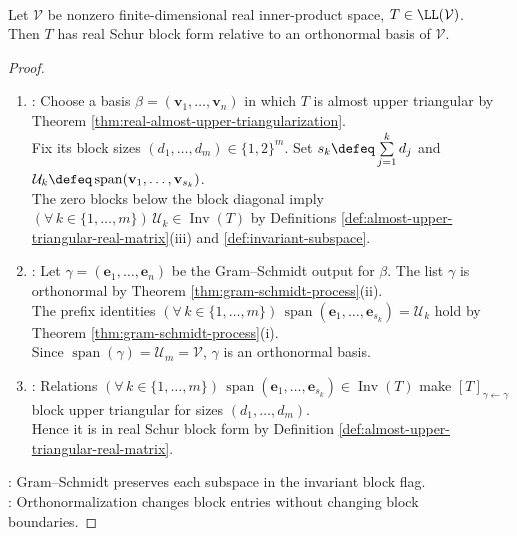 \begin{corollary} \label{cor:real-schur-block-form-orthonormal} \\
Let $\mathcal{V}$ be nonzero finite-dimensional real inner-product space, $T\in\LL(\mathcal{V})$.\\
Then $T$ has real Schur block form relative to an orthonormal basis of $\mathcal{V}$.
\begin{proof}
\begin{enumerate}[label=(\roman*)]
\setlength{\itemsep}{0pt}
\item {}: Choose a basis $\beta=(\mathbf{v}_1,\ldots,\mathbf{v}_n)$ in which $T$ is almost upper triangular by Theorem \ref{thm:real-almost-upper-triangularization}.\\
Fix its block sizes $(d_1,\ldots,d_m)\in\{1,2\}^m$. Set $s_k\defeq\sum\limits_{j=1}^{k}d_j$ and $\mathcal{U}_k\defeq\operatorname{span}(\mathbf{v}_1,\ldots,\mathbf{v}_{s_k})$.\\
The zero blocks below the block diagonal imply $(\forall\,k\in\{1,\ldots,m\})\,\mathcal{U}_k\in\operatorname{Inv}(T)$ by Definitions \ref{def:almost-upper-triangular-real-matrix}(iii) and \ref{def:invariant-subspace}.
\item {}: Let $\gamma=(\mathbf{e}_1,\ldots,\mathbf{e}_n)$ be the Gram--Schmidt output for $\beta$. The list $\gamma$ is orthonormal by Theorem \ref{thm:gram-schmidt-process}(ii).\\
The prefix identities $(\forall\,k\in\{1,\ldots,m\})\,\operatorname{span}(\mathbf{e}_1,\ldots,\mathbf{e}_{s_k})=\mathcal{U}_k$ hold by Theorem \ref{thm:gram-schmidt-process}(i).\\
Since $\operatorname{span}(\gamma)=\mathcal{U}_m=\mathcal{V}$, $\gamma$ is an orthonormal basis.
\item {}: Relations $(\forall\,k\in\{1,\ldots,m\})\,\operatorname{span}(\mathbf{e}_1,\ldots,\mathbf{e}_{s_k})\in\operatorname{Inv}(T)$ make $[T]_{\gamma\leftarrow\gamma}$ block upper triangular for sizes $(d_1,\ldots,d_m)$.\\
Hence it is in real Schur block form by Definition \ref{def:almost-upper-triangular-real-matrix}.
\end{enumerate}
: Gram--Schmidt preserves each subspace in the invariant block flag.\\
: Orthonormalization changes block entries without changing block boundaries.
\end{proof}
\end{corollary}

